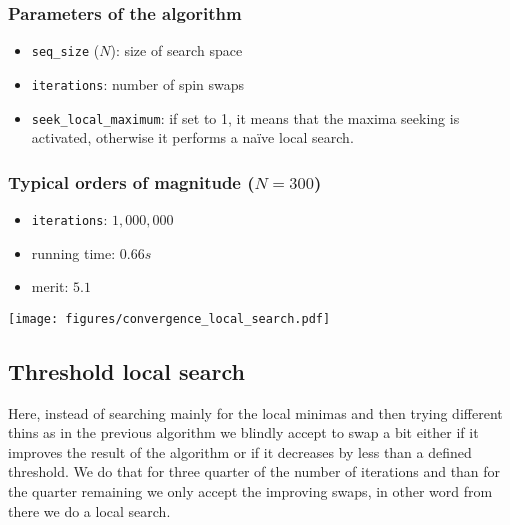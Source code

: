 \documentclass{article}
\begin{document}
  \pagebreak
  \begin{multicols}{2}

    \subsubsection*{Parameters of the algorithm}
      \begin{itemize}
        \item \texttt{seq\_size} ($N$): size of search space
        \item \texttt{iterations}: number of spin swaps
        \item \texttt{seek\_local\_maximum}: if set to 1, it means that the
          maxima seeking is activated, otherwise it performs a naïve local
          search.
      \end{itemize}

    \subsubsection*{Typical orders of magnitude ($N = 300$)}

      \begin{itemize}
        \item \texttt{iterations}: $1,000,000$
        \item running time: $0.66s$
        \item merit: $5.1$
      \end{itemize}

    \vphantom{0}

  \columnbreak

    \texttt{[image: figures/convergence\_local\_search.pdf]}

  \end{multicols}

\subsection{Threshold local search}

  Here, instead of searching mainly for the local minimas and then trying
  different thins as in the previous algorithm we blindly accept to swap a bit
  either if it improves the result of the algorithm or if it decreases by less
  than a defined threshold. We do that for three quarter of the number of
  iterations and than for the quarter remaining we only accept the improving
  swaps, in other word from there we do a local search.
\end{document}
